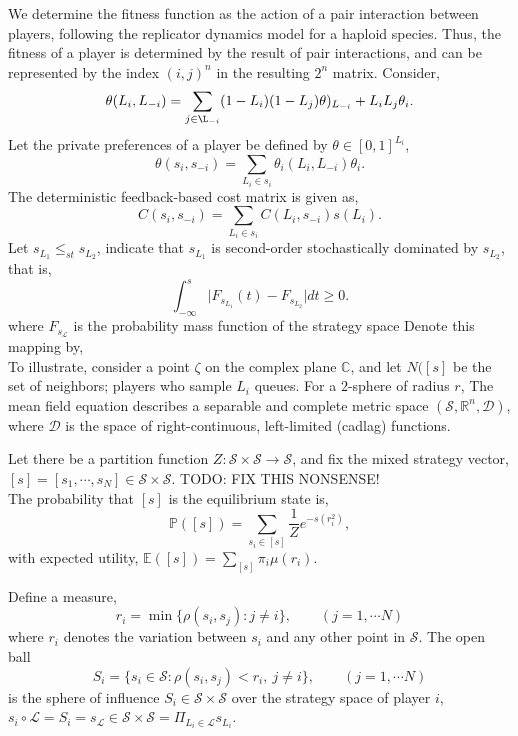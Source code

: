 \documentclass[10pt]{article}
\newcommand{\mcL}{\mathcal{L}}
\newcommand{\mcS}{\mathcal{S}}
\newcommand{\mcD}{\mathcal{D}}
\theoremstyle{definition}
\begin{document}
We determine the fitness function as the action of a pair interaction between
players, following the replicator dynamics model for a haploid species. 
Thus, the fitness of a player is determined by the result of pair interactions,
and can be represented by the index $(i,j)^n$ in the
resulting $2^n$ matrix. Consider,
$$
    \theta(L_i,L_{-i}) = \displaystyle\sum_{j\in\L_{-i}}
    (1-L_i)(1-L_j)\theta)_{L_{-i}} + L_i L_j \theta_{i}.
$$
Let the private preferences of a player be defined by $\theta \in [0,1]^{L_i}$,
$$
    \theta(s_i, s_{-i}) = \displaystyle\sum_{L_i \in s_i} \theta_i(L_i, L_{-i})\theta_i.
$$
The deterministic feedback-based cost matrix is given as,
$$
    C(s_i, s_{-i}) = \displaystyle \sum_{L_i \in s_i} C(L_i,s_{-i})s(L_i).
$$
Let $s_{L_1} \le_{st} s_{L_2}$, indicate that $s_{L_1}$ is second-order stochastically
dominated by $s_{L_2}$, that is, 
$$
    \displaystyle\int_{-\infty}^s\vert F_{s_{L_1}}(t) - F_{s_{L_2}} \vert dt \ge 0.
$$
where $F_{s_\mcL}$ is the probability mass function of the
strategy space 
Denote this mapping by,
$$
$$
To illustrate,
consider a point $\zeta$ on the complex plane $\mathbb{C}$, and
let $N([s]$ be the set of neighbors; players who sample $L_i$ queues.
For a $2$-sphere 
of radius $r$, The mean field equation describes a separable and complete metric space
$(\mcS, \mathbb{R}^n, \mcD)$, where $\mcD$ is the space of right-continuous,
left-limited (cadlag) functions.



Let there be a partition function $Z:\mcS \times \mcS\rightarrow \mcS$, 
and fix the mixed strategy vector, $[s] = [s_1, \cdots, s_N] \in
\mcS\times\mcS$.
TODO: FIX THIS NONSENSE!\\
The probability that $[s]$ is the equilibrium state is,
$$
    \mathbb{P}([s]) = \displaystyle\sum_{s_i \in [s]} \frac{1}{Z} e^{-s
    (r_i^2)},
$$
with expected utility, $\mathbb{E}([s]) = \displaystyle\sum_{[s]} \pi_i
\mu(r_i)$.

Define a measure,
$$
    r_i = \min\lbrace \rho(s_i, s_j) : j\ne i\rbrace, \qquad (j = 1, \cdots N)
$$
where $r_i$ denotes the variation between $s_i$ and any other point in
$\mcS$. The open ball
$$
    S_i  = \lbrace s_i \in \mcS : \rho(s_i, s_j) < r_i, \ j\ne i \rbrace, \qquad (j = 1, \cdots N)
$$
is the sphere of influence $S_i \in \mcS\times\mcS$ over the strategy
space of player $i$, $s_i\circ\mcL = S_i = s_{\mcL} \in \mcS\times\mcS = \Pi_{L_i\in\mcL} s_{L_i}$. 
\end{document}
